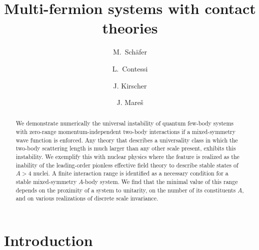 \documentclass[onecolumn,preprint,superscriptaddress,nofootinbib]{revtex4-1}
\begin{document}
\title{Multi-fermion systems with contact theories}


\author{M.~Sch{\"a}fer}
\author{L.~Contessi} 
\author{J. Kirscher}
\author{J. Mare\v{s}}




\begin{abstract}
We demonstrate numerically the universal instability of quantum few-body systems with zero-range
momentum-independent two-body interactions if a mixed-symmetry wave function
is enforced.
Any theory that describes a universality class in which the two-body
scattering length is much larger than any other scale present, exhibits this instability.
We exemplify this with nuclear physics where the feature is realized as the inability
of the leading-order pionless effective field theory to
describe stable states of $A>4$ nuclei.
A finite interaction range is identified as a necessary condition for a stable mixed-symmetry
$A$-body system.
We find that the minimal value of this range depends on the
proximity of a system to unitarity, on the number of its constituents $A$, and on various realizations of discrete scale invariance.
% 
\end{abstract}


\maketitle


\section{Introduction}
\end{document}
